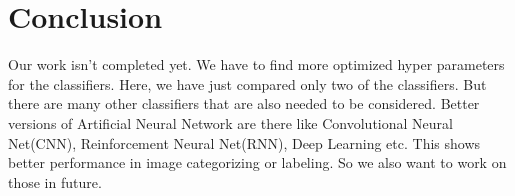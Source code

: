 \documentclass[12pt,a4paper]{article}
\begin{document}
\section{Conclusion}
Our work isn't completed yet. We have to find more optimized hyper parameters for the classifiers. Here, we have just compared only two of the classifiers. But there are many other classifiers that are also needed to be considered. Better versions of Artificial Neural Network are there like Convolutional Neural Net(CNN), Reinforcement Neural Net(RNN), Deep Learning etc. This shows better performance in image categorizing or labeling. So we also want to work on those in future.

 

\end{document}
